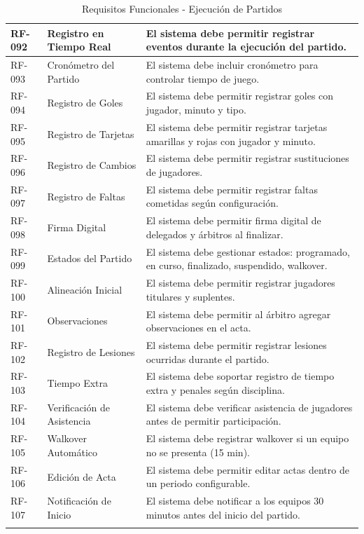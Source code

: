 \documentclass[12pt,a4paper]{article}
\begin{document}
\begin{longtable}{|>{\centering\arraybackslash}p{1.5cm}|>{\raggedright\arraybackslash}p{3.2cm}|>{\raggedright\arraybackslash}p{9cm}|}
RF-092 & Registro en Tiempo Real & El sistema debe permitir registrar eventos durante la ejecución del partido. \\
\hline
\rowcolor{rowgray}
RF-093 & Cronómetro del Partido & El sistema debe incluir cronómetro para controlar tiempo de juego. \\
\hline
RF-094 & Registro de Goles & El sistema debe permitir registrar goles con jugador, minuto y tipo. \\
\hline
\rowcolor{rowgray}
RF-095 & Registro de Tarjetas & El sistema debe permitir registrar tarjetas amarillas y rojas con jugador y minuto. \\
\hline
RF-096 & Registro de Cambios & El sistema debe permitir registrar sustituciones de jugadores. \\
\hline
\rowcolor{rowgray}
RF-097 & Registro de Faltas & El sistema debe permitir registrar faltas cometidas según configuración. \\
\hline
RF-098 & Firma Digital & El sistema debe permitir firma digital de delegados y árbitros al finalizar. \\
\hline
\rowcolor{rowgray}
RF-099 & Estados del Partido & El sistema debe gestionar estados: programado, en curso, finalizado, suspendido, walkover. \\
\hline
RF-100 & Alineación Inicial & El sistema debe permitir registrar jugadores titulares y suplentes. \\
\hline
\rowcolor{rowgray}
RF-101 & Observaciones & El sistema debe permitir al árbitro agregar observaciones en el acta. \\
\hline
RF-102 & Registro de Lesiones & El sistema debe permitir registrar lesiones ocurridas durante el partido. \\
\hline
\rowcolor{rowgray}
RF-103 & Tiempo Extra & El sistema debe soportar registro de tiempo extra y penales según disciplina. \\
\hline
RF-104 & Verificación de Asistencia & El sistema debe verificar asistencia de jugadores antes de permitir participación. \\
\hline
\rowcolor{rowgray}
RF-105 & Walkover Automático & El sistema debe registrar walkover si un equipo no se presenta (15 min). \\
\hline
RF-106 & Edición de Acta & El sistema debe permitir editar actas dentro de un periodo configurable. \\
\hline
RF-107 & Notificación de Inicio & El sistema debe notificar a los equipos 30 minutos antes del inicio del partido. \\
\hline
\caption{Requisitos Funcionales - Ejecución de Partidos}
\end{longtable}
\end{document}
